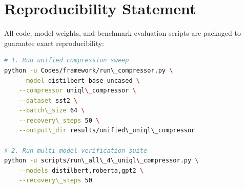 \section{Reproducibility Statement}
All code, model weights, and benchmark evaluation scripts are packaged to guarantee exact reproducibility:
\begin{lstlisting}[language=bash]
# 1. Run unified compression sweep
python -u Codes/framework/run\_compressor.py \
    --model distilbert-base-uncased \
    --compressor uniql\_compressor \
    --dataset sst2 \
    --batch\_size 64 \
    --recovery\_steps 50 \
    --output\_dir results/unified\_uniql\_compressor

# 2. Run multi-model verification suite
python -u scripts/run\_all\_4\_uniql\_compressor.py \
    --models distilbert,roberta,gpt2 \
    --recovery\_steps 50
\end{lstlisting}
